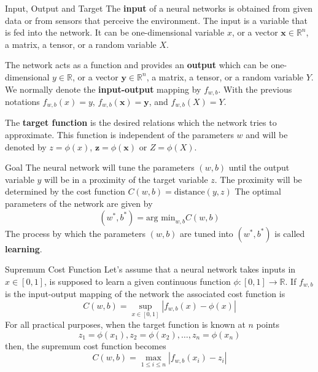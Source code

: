 \documentclass{beamer}
\begin{document}
\begin{frame}{Input, Output and Target}
	The \textbf{input} of a neural networks is obtained from given data or from sensors that perceive the environment. The input is a variable that is fed into the network. It can be one-dimensional variable $x$, or a vector $\textbf{x} \in \mathbb{R}^n$, a matrix, a tensor, or a random variable $X$. 
	
	The network acts as a function and provides an \textbf{output} which can be one-dimensional $y \in \mathbb{R}$, or a vector $\textbf{y} \in \mathbb{R}^n$, a matrix, a tensor, or a random variable $Y$. We normally denote the \textbf{input-output} mapping by $f_{w,b}$. With the previous notations $f_{w,b}(x)=y$, $f_{w,b}(\textbf{x})= \textbf{y}$, and $f_{w,b}(X)=Y$.
	
	The \textbf{target function} is the desired relations which the network tries to approximate. This function is independent of the parameters $w$ and will be denoted by $z=\phi(x)$, $\textbf{z}=\phi(\textbf{x})$ or $Z=\phi(X)$.  
	 
	
\end{frame}

\begin{frame}{Goal}
	The neural network will tune the parameters $(w,b)$ until the output variable $y$ will be in a proximity of the target variable $z$. The proximity will be determined by the cost function $C(w,b)=\text{distance}(y,z)$
	The optimal parameters of the network are given  by 
	\begin{equation*}
		(w^*,b^*)= \text{arg min}_{w,b} C(w,b)
	\end{equation*}
	The process by which the parameters $(w,b)$ are tuned into $(w^*,b^*)$ is called \textbf{learning}.
\end{frame}

\begin{frame}{Supremum Cost Function}
	Let's assume that a neural network takes inputs in $x\in [0,1]$, is supposed to learn a given continuous function $\phi \colon [0,1] \to \mathbb{R}$. If $f_{w,b}$ is the input-output mapping of the network the associated cost function is 
	\begin{equation*}
		C(w,b)=\sup_{x \in [0,1]} |f_{w,b}(x)-\phi(x) |
	\end{equation*}
	For all practical purposes, when the target function is known at $n$ points
	\begin{equation*}
		z_1=\phi(x_1), z_2=\phi(x_2), \ldots, z_n= \phi(x_n)
	\end{equation*}
	then, the supremum cost function becomes
	\begin{equation*}
		C(w,b)= \max_{1\le i\le n} |f_{w,b}(x_i)- z_i|
	\end{equation*}
\end{frame}
\end{document}
